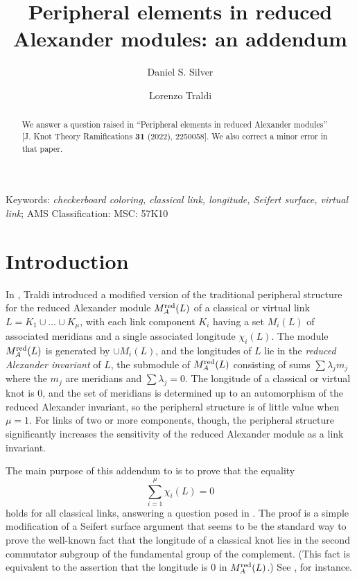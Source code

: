 \documentclass[11pt]{article}
\numberwithin{equation}{section}
\theoremstyle{definition}
\newcommand{\Mr}{M_A^{\textup{red}}}
\begin{document}
\title{Peripheral elements in reduced Alexander modules: an addendum} 

\author{Daniel S. Silver
\and
Lorenzo Traldi}

\maketitle %


\begin{abstract} We answer a question raised in ``Peripheral elements in reduced Alexander modules'' [J. Knot Theory Ramifications {\bf 31} (2022), 2250058]. We also correct a minor error in that paper.
\end{abstract}

\begin{center} Keywords: \textit {checkerboard coloring, classical link, longitude, Seifert surface, virtual link};   AMS Classification: MSC: 57K10 \end{center}

\section{Introduction} \label{Intro} 

In \cite[Defs.\ 1 and 2]{T}, Traldi introduced a modified version of the traditional peripheral structure for the reduced Alexander module $\Mr(L)$ of a classical or virtual link $L=K_1 \cup \dots \cup K_\mu$, with each link component $K_i$ having a set $M_i(L)$ of associated meridians and a single associated longitude $\chi_i(L)$. The module $\Mr(L)$ is generated by $\cup M_i(L)$, and the longitudes of $L$ lie in the \emph{reduced Alexander invariant} of $L$, the submodule of $\Mr(L)$ consisting of sums $\sum \lambda_j m_j$ where the $m_j$ are meridians and $\sum \lambda_j=0$. The longitude of a classical or virtual knot is 0, and the set of meridians is determined up to an automorphism of the reduced Alexander invariant, so the peripheral structure is of little value when $\mu=1$. For links of two or more components, though, the peripheral structure significantly increases the sensitivity of the reduced Alexander module as a link invariant.

The main purpose of this addendum to \cite{T} is to prove that the equality 
\[
\sum_{i=1}^ \mu \chi_i(L)=0
\]
holds for all classical links, answering a question posed in \cite{T}. The proof is a simple modification of a Seifert surface argument that seems to be the standard way to prove the well-known fact that the longitude of a classical knot lies in the second commutator subgroup of the fundamental group of the complement. (This fact is equivalent to the assertion that the longitude is $0$ in $\Mr(L)$.) See \cite[p.\ 39]{BZ03}, for instance.
\end{document}
